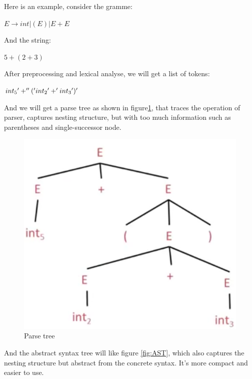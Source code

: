         Here is an example, consider the gramme:
           
           $E \rightarrow int |(E)| E + E $
            
            And the string:
            
            $5+(2+3)$
           
            After preprocessing and lexical analyse, we will get a list of tokens:
            
            $int\textsubscript{5}'+''('int\textsubscript{2}'+'int\textsubscript{3}')'$
            
            
            And we will get a parse tree as shown in figure\ref{fig:parseTree}, that traces the operation of parser, captures nesting structure, but with too much information such as parentheses and single-successor node.  
             \begin{figure}[H]
                \centering
                \includegraphics[scale = 0.25]
                {Images/concepts/parseTree.png}
                \caption[ parseTree]%
                { Parse tree\footnotemark}
                \label{fig:parseTree}
            \end{figure}
            
            
            And the abstract syntax tree will like figure \ref{fig:AST}, which also captures the nesting structure but abstract from the concrete syntax. It's more compact and easier to use.
        
